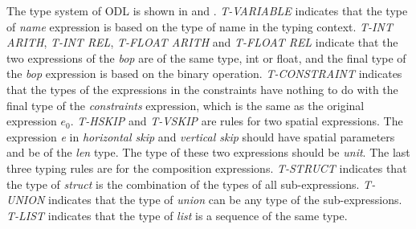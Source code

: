 The type system of ODL is shown in  and 
. 
{\em T-VARIABLE} indicates that the type of {\em name} expression is based on 
the type of name in the typing context. {\em T-INT ARITH}, {\em T-INT REL}, 
{\em T-FLOAT ARITH} and {\em T-FLOAT REL} 
indicate that the two expressions of the {\em bop} are of the same type, int or float, and 
the final type of the {\em bop} expression is based on the binary operation. 
{\em T-CONSTRAINT} indicates that the types of the expressions 
in the constraints have nothing to do with the 
final type of the {\em constraints} expression, which is the same as the original 
expression {\em $e_0$}. 
{\em T-HSKIP} and {\em T-VSKIP} are rules for two spatial expressions. 
The expression {\em e} in {\em horizontal skip} and {\em vertical skip} 
should have spatial parameters and be of the {\em len} type. The type of 
these two expressions should be {\em unit}. The last three typing rules 
are for the composition expressions. {\em T-STRUCT} indicates that the type 
of {\em struct} is the combination of the types of all sub-expressions. 
{\em T-UNION} indicates that the type of {\em union} can be 
any type of the sub-expressions. {\em T-LIST} indicates that the type of 
{\em list} is a sequence of the same type. 

